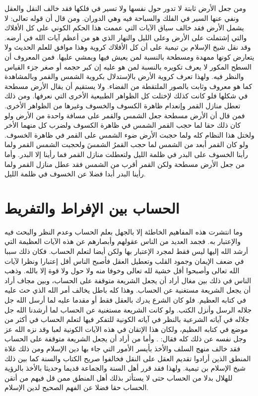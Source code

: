 ومن جعل الأرض ثابتة لا تدور حول نفسها ولا تسير في فلكها فقد خالف النقل والعقل ونفي عنها السير  في الفلك والسباحة فيه وهي الدوران. ومن قال أن قوله تعالى: \quranayah*[36][40][12] {\footnotesize (\surahname*[36])} لا يشمل الأرض فقد خالف سياق الآيات التي عممت هذا الحكم الكوني على كل الأفلاك والتي إشتملت على الأرض وعلى الليل والنهار الذي هو من أعظم آيات الله في أرضه. وقد نقل شيخ الإسلام بن تيمية على أن كل الأفلاك كروية وهذا موافق للعلم الحديث ولا يتعارض كونها ممهدة ومسطحة بالنسبة لمن يعيش فيها ويمشي عليها. فمن المعروف أن السطح المكور لا يعرف تكويره بالنسبة لمن هو عليه إن كبر حجمه أو صغر جزء القياس والنظر فيه. ولهذا تعرف كروية الأرض بالإستدلال بكروية الشمس والقمر وبالمشاهدة كما هو معروف وثابت بالصور الملتقطة من الفضاء. ولا يستقيم أن يقال الأرض مسطحة في شكلها فلو كانت كذلك لإختلت كل الظواهر الطبيعية الأخرى التي نعرفها. ومن ذلك تعطل منازل القمر وإنعدام ظاهرة الكسوف والخسوف وغيرها من الظواهر الأخرى. فمن قال أن الأرض مسطحة جعل الشمس والقمر على مسافة واحدة من الأرض ولو كان ذلك حقا لما حجب القمر الشمس في ظاهرة الكسوف ولضرب كل منهما الأخر ولختل هذا النظام كله ولما حجبت الأرض ضوء الشمس على القمر في ظاهرة الخسوف. ولو كان القمر أبعد من الشمس لما حجب القمرُ الشمسَ ولحجبت الشمس القمر ولما رأينا الخسوف على البدر في ظلمة الليل ولتعطلت منازل القمر فما رأينا إلا البدر. وأما من جعل الأرض مسطحة ولكن القمر أقرب من الشمس فقد عطل منازل القمر ولما رأينا البدر أبدا فضلا عن الخسوف في ظلمة الليل.

\section{الحساب بين الإفراط والتفريط}

وما انتشرت هذه المفاهيم الخاطئة إلا بالجهل بعلم الحساب وعدم النظر والبحث فيه والإعتبار به. فجمد العديد من الناس عقولهم وأبصارهم عن هذه الآيات العظيمة التي أرشد الله إليها ليس فقط لمجرد الإعتبار بها ولكن أيضا لتعلم الحساب. فكان ذلك سببا في ضعف الإيمان وجمود القلب وتعطيل العقل فأصبح الناس أقل إعتبارا ونظرا لآيات الله تعالى وأصبحوا أقل خشية لله تعالى وخوفا منه ولا حول ولا قوة إلا بالله. وذهب الناس في ذلك بين مغال أراد أن يجعل الشريعة متوقفة على الحساب، وبين مجاف أراد أن يجعل الشريعة مستغنية عن الحساب. وهذا كله باطل يخالف أمر الله الذي حث عليه في كتابه العظيم. فلو كان الشرع يدرك بالعقل فقط أو مقدما عليه لما أرسل الله جل جلاله الرسل وأنزل الكتب. ولو كانت الشريعة مستغنية عن الحساب لما أرشدنا الله جل جلاله في آياته الشرعية بالنظر في آياته الكونية للتفكر فيها لتعلم الحساب في أكثر من موضع في كتابه العظيم، ولكان هذا الإتقان في هذه الآيات الكونية لعبا وقد نزه الله عز وجل نفسه عن ذلك كله فقال: \quranayah*[44][38-39] {\footnotesize (\surahname*[44])}. وأما من أراد أن يجعل الشريعة متوقفة على الحساب فقد خالف منهج السلف والأخذ بأيسر الأمور التي جاء بها دين الإسلام ومن ذلك غلاة المنطق الذين أرادوا تقديم العقل على النقل فخالفوا صريح الكتاب والسنة كما بين ذلك شيخ الإسلام بن تيمية. ولهذا فقد قرر أهل السنة والجماعة قديما وحديثا بالأخذ بالرؤية للهلال بدلا من الحساب حتى لا يستأثر بذلك أهل المنطق ممن قل فيهم من أتقن الحساب حقا فضلا عن الفهم الصحيح لدين الإسلام.

